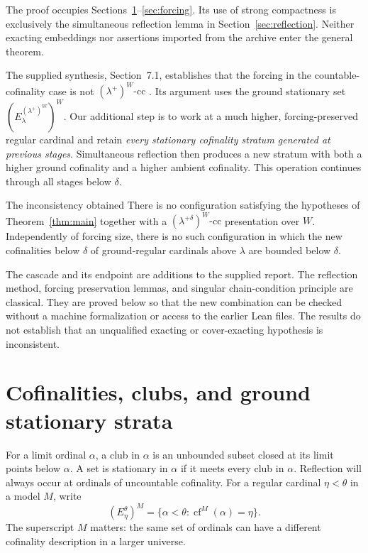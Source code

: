 \documentclass[11pt,letterpaper]{article}
\theoremstyle{definition}
\numberwithin{equation}{section}
\newcommand{\cf}{\operatorname{cf}}
\newcommand{\cc}{\text{-cc}}
\begin{document}
The proof occupies Sections~\ref{sec:cof}--\ref{sec:forcing}. Its use of strong compactness is exclusively the simultaneous reflection lemma in Section~\ref{sec:reflection}. Neither exacting embeddings nor assertions imported from the archive enter the general theorem.

The supplied synthesis, Section~7.1, establishes that the forcing in the countable-cofinality case is not $(\lambda^+)^W\cc$ \cite{synthesis}. Its argument uses the ground stationary set $(E^{(\lambda^+)^W}_\lambda)^W$. Our additional step is to work at a much higher, forcing-preserved regular cardinal and retain \emph{every stationary cofinality stratum generated at previous stages}. Simultaneous reflection then produces a new stratum with both a higher ground cofinality and a higher ambient cofinality. This operation continues through all stages below $\delta$.

\begin{assessment}{The inconsistency obtained}
There is no configuration satisfying the hypotheses of Theorem~\ref{thm:main} together with a $(\lambda^{+\delta})^W\cc$ presentation over $W$. Independently of forcing size, there is no such configuration in which the new cofinalities below $\delta$ of ground-regular cardinals above $\lambda$ are bounded below $\delta$.
\end{assessment}

The cascade and its endpoint are additions to the supplied report. The reflection method, forcing preservation lemmas, and singular chain-condition principle are classical. They are proved below so that the new combination can be checked without a machine formalization or access to the earlier Lean files. The results do not establish that an unqualified exacting or cover-exacting hypothesis is inconsistent.

\section{Cofinalities, clubs, and ground stationary strata}\label{sec:cof}

For a limit ordinal $\alpha$, a club in $\alpha$ is an unbounded subset closed at its limit points below $\alpha$. A set is stationary in $\alpha$ if it meets every club in $\alpha$. Reflection will always occur at ordinals of uncountable cofinality. For a regular cardinal $\eta<\theta$ in a model $M$, write
\[
(E^\theta_\eta)^M=\{\alpha<\theta:\cf^M(\alpha)=\eta\}.
\]
The superscript $M$ matters: the same set of ordinals can have a different cofinality description in a larger universe.
\end{document}
